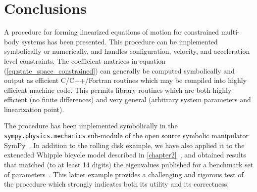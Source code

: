 \section{Conclusions}
A procedure for forming linearized equations of motion for constrained
multi-body systems has been presented. This procedure can be implemented
symbolically or numerically, and handles configuration, velocity, and
acceleration level constraints. The coefficient matrices in equation
(\ref{eq:state_space_constrained}) can generally be computed symbolically and
output as efficient C/C++/Fortran routines which may be compiled into highly
efficient machine code. This permits library routines which are both highly
efficient (no finite differences) and very general (arbitrary system parameters
and linearization point).

The procedure has been implemented symbolically in the
\texttt{sympy.physics.mechanics} sub-module of the open source symbolic
manipulator SymPy~\cite{SymPy}. In addition to the rolling disk example, we
have also applied it to the exteneded Whipple bicycle model described in
\autoref{chapter2}~\cite{libbicycle}, and obtained results that matched (to at
least 14 digits) the eigenvalues published for a benchmark set of
parameters~\cite{Meijaard2007}. This latter example provides a challenging and
rigorous test of the procedure which strongly indicates both its utility and
its correctness.

